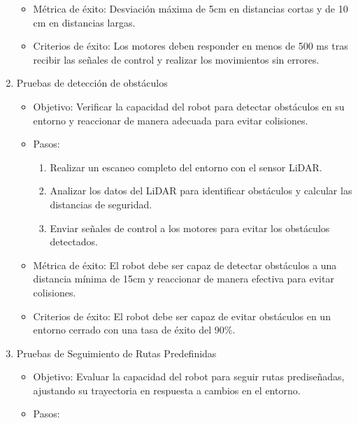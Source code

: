 \begin{enumerate}
\begin{itemize}
\begin{enumerate}
                \end{enumerate}
            \item M\'etrica de \'exito: Desviaci\'on m\'axima de 5cm en distancias cortas y de 10 cm en distancias largas.
            \item Criterios de \'exito: Los motores deben responder en menos de 500 ms
                tras recibir las se\~nales de control y realizar los movimientos sin errores.
        \end{itemize}
        \item Pruebas de detecci\'on de obst\'aculos
        \begin{itemize}
            \item Objetivo: Verificar la capacidad del robot para detectar obst\'aculos en su
                entorno y reaccionar de manera adecuada para evitar colisiones.
            \item Pasos:
                \begin{enumerate}
                    \item Realizar un escaneo completo del entorno con el sensor LiDAR.
                    \item Analizar los datos del LiDAR para identificar obst\'aculos y calcular
                        las distancias de seguridad.
                    \item Enviar se\~nales de control a los motores para evitar los obst\'aculos
                        detectados.
                \end{enumerate}
            \item M\'etrica de \'exito: El robot debe ser capaz de detectar obst\'aculos a una
                distancia m\'inima de 15cm y reaccionar de manera efectiva para evitar
                colisiones.
            \item Criterios de \'exito: El robot debe ser capaz de evitar obst\'aculos en un
                entorno cerrado con una tasa de \'exito del 90\%.
        \end{itemize}
        \item Pruebas de Seguimiento de Rutas Predefinidas
        \begin{itemize}
            \item Objetivo: Evaluar la capacidad del robot para seguir rutas predise\~nadas,
            ajustando su trayectoria en respuesta a cambios en el entorno.
            \item Pasos:
                \begin{enumerate}

\end{enumerate}
\end{itemize}
\end{enumerate}
